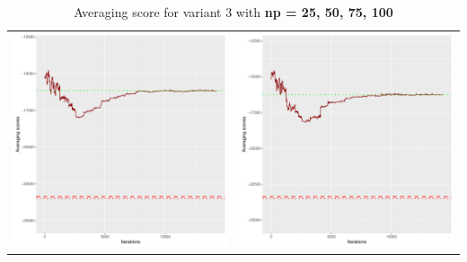 \documentclass[]{scrartcl}
\begin{document}
\begin{table}[h!]
\begin{tabular}{cc}
\includegraphics[scale = 0.4]{./figs/win95pts/v3/75/avgBoundsEvolution-14252.pdf} & 
\includegraphics[scale = 0.4]{./figs/win95pts/v3/100/avgBoundsEvolution-14252.pdf} \\
\end{tabular}
\caption{Averaging score for variant 3 with \textbf{np =  25, 50, 75, 100}}
\end{table}
\end{document}
